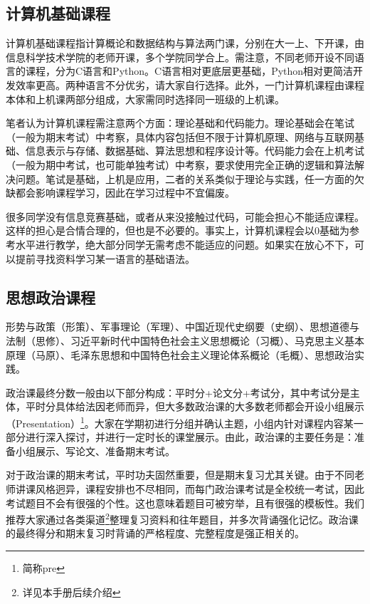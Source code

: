\documentclass[11pt,oneside]{book}
\begin{document}
\subsection{计算机基础课程}

计算机基础课程指计算概论和数据结构与算法两门课，分别在大一上、下开课，由信息科学技术学院的老师开课，多个学院同学合上。需注意，不同老师开设不同语言的课程，分为C语言和Python。C语言相对更底层更基础，Python相对更简洁开发效率更高。两种语言不分优劣，请大家自行选择。此外，一门计算机课程由课程本体和上机课两部分组成，大家需同时选择同一班级的上机课。

\vspace{10pt}

笔者认为计算机课程需注意两个方面：理论基础和代码能力。理论基础会在笔试（一般为期末考试）中考察，具体内容包括但不限于计算机原理、网络与互联网基础、信息表示与存储、数据基础、算法思想和程序设计等。代码能力会在上机考试（一般为期中考试，也可能单独考试）中考察，要求使用完全正确的逻辑和算法解决问题。笔试是基础，上机是应用，二者的关系类似于理论与实践，任一方面的欠缺都会影响课程学习，因此在学习过程中不宜偏废。

\vspace{10pt}

很多同学没有信息竞赛基础，或者从来没接触过代码，可能会担心不能适应课程。这样的担心是合情合理的，但也是不必要的。事实上，计算机课程会以0基础为参考水平进行教学，绝大部分同学无需考虑不能适应的问题。如果实在放心不下，可以提前寻找资料学习某一语言的基础语法。

\subsection{思想政治课程}
形势与政策（形策）、军事理论（军理）、中国近现代史纲要（史纲）、思想道德与法制（思修）、习近平新时代中国特色社会主义思想概论（习概）、马克思主义基本原理（马原）、毛泽东思想和中国特色社会主义理论体系概论（毛概）、思想政治实践。

\vspace{10pt}

政治课最终分数一般由以下部分构成：平时分+论文分+考试分，其中考试分是主体，平时分具体给法因老师而异，但大多数政治课的大多数老师都会开设小组展示（Presentation）\footnote{简称pre}。大家在学期初进行分组并确认主题，小组内针对课程内容某一部分进行深入探讨，并进行一定时长的课堂展示。由此，政治课的主要任务是：准备小组展示、写论文、准备期末考试。

\vspace{10pt}

对于政治课的期末考试，平时功夫固然重要，但是期末复习尤其关键。由于不同老师讲课风格迥异，课程安排也不尽相同，而每门政治课考试是全校统一考试，因此考试题目不会有很强的个性。这也意味着题目可被穷举，且有很强的模板性。我们推荐大家通过各类渠道\footnote{详见本手册后续介绍}整理复习资料和往年题目，并多次背诵强化记忆。政治课的最终得分和期末复习时背诵的严格程度、完整程度是强正相关的。
\end{document}
